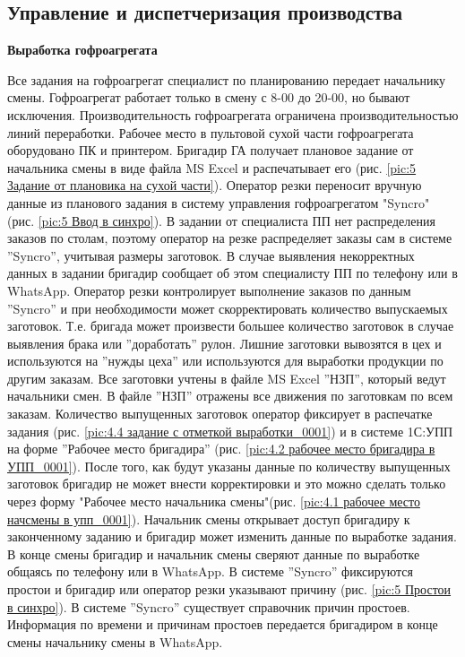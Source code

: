 \clearpage


\newpage
\subsection{Управление и диспетчеризация производства}
\label{bp:production}





\textbf{Выработка гофроагрегата}

Все задания на гофроагрегат специалист по планированию передает начальнику смены. Гофроагрегат работает только в смену с 8-00 до 20-00, но бывают исключения. Производительность гофроагрегата ограничена производительностью линий переработки. Рабочее место в пультовой сухой части гофроагрегата оборудовано ПК и принтером. Бригадир ГА получает плановое задание от начальника смены в виде файла MS Excel и распечатывает его (рис. \ref{pic:5 Задание от плановика на сухой части}). Оператор резки переносит вручную данные из планового задания в систему управления гофроагрегатом "Syncro" (рис. \ref{pic:5 Ввод в синхро}). В задании от специалиста ПП нет распределения заказов по столам, поэтому оператор на резке распределяет заказы сам в системе ''Syncro'', учитывая размеры заготовок. В случае выявления некорректных данных в задании бригадир сообщает об этом специалисту ПП по телефону или в WhatsApp. Оператор резки контролирует выполнение заказов по данным ''Syncro'' и при необходимости может скорректировать количество выпускаемых заготовок. Т.е. бригада может произвести большее количество заготовок в случае выявления брака или ''доработать'' рулон. Лишние заготовки вывозятся в цех и используются на ''нужды цеха'' или используются для выработки продукции по другим заказам. Все заготовки учтены в файле MS Excel ''НЗП'', который ведут начальники смен. В файле ''НЗП'' отражены все движения по заготовкам по всем заказам. Количество выпущенных заготовок оператор фиксирует в распечатке задания (рис. \ref{pic:4.4 задание с отметкой выработки_0001}) и в системе 1С:УПП на форме ''Рабочее место бригадира'' (рис. \ref{pic:4.2 рабочее место бригадира в УПП_0001}). После того, как будут указаны данные по количеству выпущенных заготовок бригадир не может внести корректировки и это можно сделать только через форму "Рабочее место начальника смены"(рис. \ref{pic:4.1 рабочее место начсмены в упп_0001}). Начальник смены открывает доступ бригадиру к законченному заданию и бригадир может изменить данные по выработке задания. В конце смены бригадир и начальник смены сверяют данные по выработке общаясь  по телефону или в WhatsApp. В системе ''Syncro'' фиксируются простои и бригадир или оператор резки указывают причину (рис. \ref{pic:5 Простои в синхро}). В системе ''Syncro'' существует справочник причин простоев. Информация по времени и причинам простоев передается бригадиром в конце смены начальнику смены в WhatsApp. 

